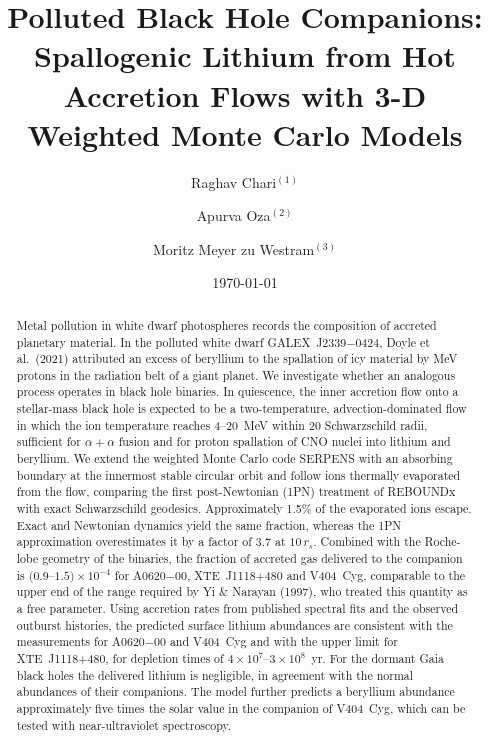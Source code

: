 \documentclass[twocolumn,showpacs,preprintnumbers,amsmath,amssymb]{revtex4}
\begin{document}
\title{Polluted Black Hole Companions: Spallogenic Lithium from Hot Accretion Flows with 3-D Weighted Monte Carlo Models}

\author{Raghav Chari$^{(1)}$}
\author{Apurva Oza$^{(2)}$}
\author{Moritz Meyer zu Westram$^{(3)}$}


\date{\today}

\begin{abstract}
Metal pollution in white dwarf photospheres records the composition of accreted planetary material. In the polluted white dwarf GALEX~J2339$-$0424, Doyle et al.\ (2021) attributed an excess of beryllium to the spallation of icy material by MeV protons in the radiation belt of a giant planet. We investigate whether an analogous process operates in black hole binaries. In quiescence, the inner accretion flow onto a stellar-mass black hole is expected to be a two-temperature, advection-dominated flow in which the ion temperature reaches 4--20~MeV within 20 Schwarzschild radii, sufficient for $\alpha+\alpha$ fusion and for proton spallation of CNO nuclei into lithium and beryllium. We extend the weighted Monte Carlo code SERPENS with an absorbing boundary at the innermost stable circular orbit and follow ions thermally evaporated from the flow, comparing the first post-Newtonian (1PN) treatment of REBOUNDx with exact Schwarzschild geodesics. Approximately 1.5\% of the evaporated ions escape. Exact and Newtonian dynamics yield the same fraction, whereas the 1PN approximation overestimates it by a factor of 3.7 at $10\,r_s$. Combined with the Roche-lobe geometry of the binaries, the fraction of accreted gas delivered to the companion is $(0.9$--$1.5)\times10^{-4}$ for A0620$-$00, XTE~J1118+480 and V404~Cyg, comparable to the upper end of the range required by Yi \& Narayan (1997), who treated this quantity as a free parameter. Using accretion rates from published spectral fits and the observed outburst histories, the predicted surface lithium abundances are consistent with the measurements for A0620$-$00 and V404~Cyg and with the upper limit for XTE~J1118+480, for depletion times of $4\times10^{7}$--$3\times10^{8}$~yr. For the dormant Gaia black holes the delivered lithium is negligible, in agreement with the normal abundances of their companions. The model further predicts a beryllium abundance approximately five times the solar value in the companion of V404~Cyg, which can be tested with near-ultraviolet spectroscopy.
\end{abstract}
\end{document}
